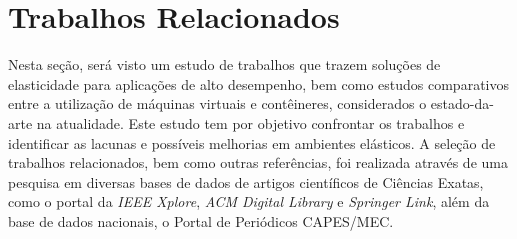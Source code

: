 \documentclass[twoside,english,brazilian]{UNISINOSartigo}
\begin{document}

\section{Trabalhos Relacionados}
\label{related}
Nesta seção, será visto um estudo de trabalhos que trazem soluções de elasticidade para aplicações de alto desempenho, bem como estudos comparativos entre a utilização de máquinas virtuais e contêineres, considerados o estado-da-arte na atualidade. Este estudo tem por objetivo confrontar os trabalhos e identificar as lacunas e possíveis melhorias em ambientes elásticos. A seleção de trabalhos relacionados, bem como outras referências, foi realizada através de uma pesquisa em diversas bases de dados de artigos científicos de Ciências Exatas, como o portal da \textit{IEEE Xplore}, \textit{ACM Digital Library} e \textit{Springer Link}, além da base de dados nacionais, o Portal de Periódicos CAPES/MEC.
\end{document}
